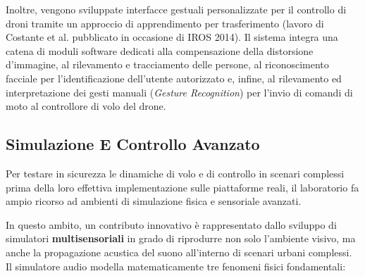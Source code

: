 ﻿\documentclass[11pt, a4paper]{article}
\begin{document}

Inoltre, vengono sviluppate interfacce gestuali personalizzate per il controllo di droni tramite un approccio di apprendimento per trasferimento (lavoro di Costante et al. pubblicato in occasione di IROS 2014). Il sistema integra una catena di moduli software dedicati alla compensazione della distorsione d'immagine, al rilevamento e tracciamento delle persone, al riconoscimento facciale per l'identificazione dell'utente autorizzato e, infine, al rilevamento ed interpretazione dei gesti manuali (\emph{Gesture Recognition}) per l'invio di comandi di moto al controllore di volo del drone.


\newpage

\subsection{Simulazione E Controllo Avanzato}

Per testare in sicurezza le dinamiche di volo e di controllo in scenari complessi prima della loro effettiva implementazione sulle piattaforme reali, il laboratorio fa ampio ricorso ad ambienti di simulazione fisica e sensoriale avanzati.


In questo ambito, un contributo innovativo è rappresentato dallo sviluppo di simulatori \textbf{multisensoriali} in grado di riprodurre non solo l'ambiente visivo, ma anche la propagazione acustica del suono all'interno di scenari urbani complessi. Il simulatore audio modella matematicamente tre fenomeni fisici fondamentali:
\end{document}
